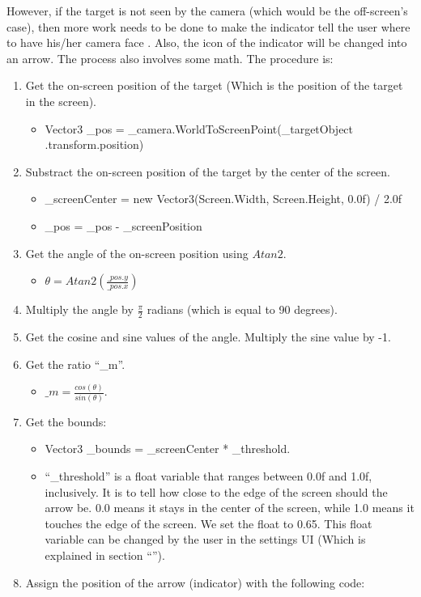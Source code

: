 However, if the target is not seen by the camera (which would be the off-screen's case), then more work needs to be done to make the indicator tell the user where to have his/her camera face \cite{IndicatorVideo}. Also, the icon of the indicator will be changed into an arrow. The process also involves some math. The procedure is:
\begin{enumerate}
\item{Get the on-screen position of the target (Which is the position of the target in the screen).}
\begin{itemize}
\item{{\codefont Vector3 \_pos = \_camera.WorldToScreenPoint(\_targetObject .transform.position)}}
\end{itemize}
\item{Substract the on-screen position of the target by the center of the screen.}
\begin{itemize}
\item{{\codefont \_screenCenter = new Vector3(Screen.Width, Screen.Height, 0.0f) / 2.0f}}
\item{{\codefont \_pos = \_pos - \_screenPosition}}
\end{itemize}
\item{Get the angle of the on-screen position using $Atan2$.}
\begin{itemize}
\item{$\theta = Atan2(\frac{\_pos.y}{\_pos.x})$}
\end{itemize}
\item{Multiply the angle by $\frac{\pi}{2}$ radians (which is equal to 90 degrees).}
\item{Get the cosine and sine values of the angle. Multiply the sine value by -1.}
\item{Get the ratio “{\codefont \_m}”.}
\begin{itemize}
\item{$\_m = \frac{cos(\theta)}{sin(\theta)}$}.
\end{itemize}
\item{Get the bounds:}
\begin{itemize}
\item{{\codefont Vector3 \_bounds = \_screenCenter * \_threshold}.}
\item{“{\codefont \_threshold}” is a float variable that ranges between 0.0f and 1.0f, inclusively. It is to tell how close to the edge of the screen should the arrow be. 0.0 means it stays in the center of the screen, while 1.0 means it touches the edge of the screen. We set the float to 0.65. This float variable can be changed by the user in the settings UI (Which is explained in section “\textbf{}”).}
\end{itemize}
\item{Assign the position of the arrow (indicator) with the following code:}


\end{enumerate}
